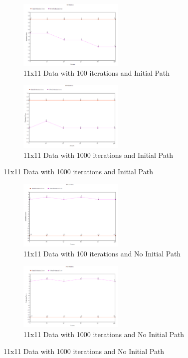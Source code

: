 \documentclass[11pt, oneside]{article}   	%
\begin{document}
\begin{figure}[H]
\centering
\begin{subfigure}{.5\textwidth}
	\centering
	\includegraphics[width=50mm]{11x11restart.png}
	\caption{11x11 Data with 100 iterations and Initial Path}
	\label{fig:method}
\end{subfigure}%
\begin{subfigure}{.5\textwidth}
	\centering
	\includegraphics[width=50mm]{11x11restart2.png}
	\caption{11x11 Data with 1000 iterations and Initial Path}
	\label{fig:method}
\end{subfigure}
\end{figure}

\begin{figure}[H]
\centering
\begin{subfigure}{.5\textwidth}
	\centering
	\includegraphics[width=50mm]{11x11restPath.png}
	\caption{11x11 Data with 100 iterations and No Initial Path}
	\label{fig:method}
\end{subfigure}%
\begin{subfigure}{.5\textwidth}
	\centering
	\includegraphics[width=50mm]{11x11restPath2.png}
	\caption{11x11 Data with 1000 iterations and No Initial Path}
	\label{fig:method}
\end{subfigure}
\end{figure}
\end{document}
